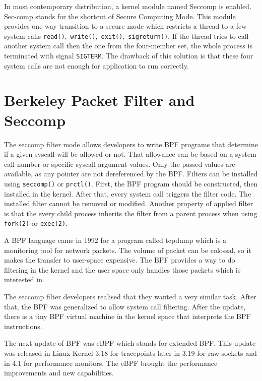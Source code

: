 In most contemporary distribution, a kernel module named Seccomp
\cite{seccomp_sandbox} is enabled. Sec-comp stands for the shortcut of Secure
Computing Mode. This module provides one way transition to a secure mode which
restricts a thread to a few system calls \texttt{read()},\ \texttt{write()},\
\texttt{exit()},\ \texttt{sigreturn()}. If the thread tries to call another
system call then the one from the four-member set, the whole process is
terminated with signal \texttt{SIGTERM}. The drawback of this solution is that
these four system calls are not enough for application to run correctly.


\section{Berkeley Packet Filter and Seccomp}
The seccomp filter mode allows developers to write BPF programs that determine
if a given syscall will be allowed or not. That allowance can be based on a
system call number or specific syscall argument values. Only the passed values
are available, as any pointer are not dereferenced by the BPF. Filters can be
installed using \texttt{seccomp()} or \texttt{prctl()}. First, the BPF program
should be constructed, then installed in the kernel. After that, every system
call triggers the filter code. The installed filter cannot be removed or
modified. Another property of applied filter is that the every child process
inherits the filter from a parent process when using \texttt{fork(2)} or
\texttt{exec(2)}.

A BPF language came in 1992 for a program called tcpdump which is a monitoring
tool for network packets. The volume of packet can be colossal, so it makes the
transfer to user-space expensive. The BPF provides a way to do filtering in the
kernel and the user space only handles those packets which is interested in.

The seccomp filter developers realised that they wanted a very similar task. After
that, the BPF was generalized to allow system call filtering. After the update,
there is a tiny BPF virtual machine in the kernel space that interprets the BPF
instructions.

The next update of BPF was eBPF which stands for extended BPF. This update
was released in Linux Kernel 3.18 for tracepoints later in 3.19 for raw sockets
and in 4.1 for performance monitors. The eBPF brought the performance
improvements and new capabilities.

